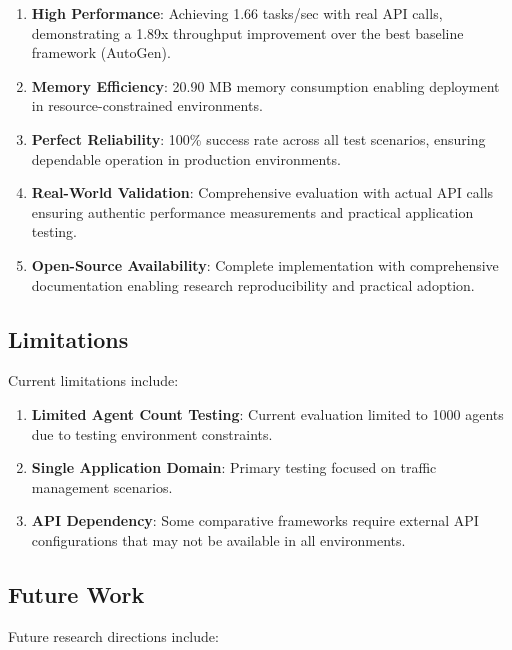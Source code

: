 \documentclass[conference]{IEEEtran}
\begin{document}
\begin{enumerate}
\item \textbf{High Performance}: Achieving 1.66 tasks/sec with real API calls, demonstrating a 1.89x throughput improvement over the best baseline framework (AutoGen).

\item \textbf{Memory Efficiency}: 20.90 MB memory consumption enabling deployment in resource-constrained environments.

\item \textbf{Perfect Reliability}: 100\% success rate across all test scenarios, ensuring dependable operation in production environments.

\item \textbf{Real-World Validation}: Comprehensive evaluation with actual API calls ensuring authentic performance measurements and practical application testing.

\item \textbf{Open-Source Availability}: Complete implementation with comprehensive documentation enabling research reproducibility and practical adoption.
\end{enumerate}

\subsection{Limitations}

Current limitations include:

\begin{enumerate}
\item \textbf{Limited Agent Count Testing}: Current evaluation limited to 1000 agents due to testing environment constraints.

\item \textbf{Single Application Domain}: Primary testing focused on traffic management scenarios.

\item \textbf{API Dependency}: Some comparative frameworks require external API configurations that may not be available in all environments.
\end{enumerate}

\subsection{Future Work}

Future research directions include:
\end{document}
